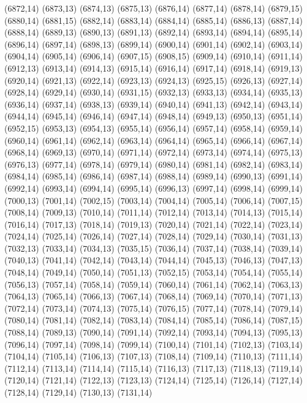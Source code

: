 (6872,14)
(6873,13)
(6874,13)
(6875,13)
(6876,14)
(6877,14)
(6878,14)
(6879,15)
(6880,14)
(6881,15)
(6882,14)
(6883,14)
(6884,14)
(6885,14)
(6886,13)
(6887,14)
(6888,14)
(6889,13)
(6890,13)
(6891,13)
(6892,14)
(6893,14)
(6894,14)
(6895,14)
(6896,14)
(6897,14)
(6898,13)
(6899,14)
(6900,14)
(6901,14)
(6902,14)
(6903,14)
(6904,14)
(6905,14)
(6906,14)
(6907,15)
(6908,15)
(6909,14)
(6910,14)
(6911,14)
(6912,13)
(6913,14)
(6914,13)
(6915,14)
(6916,14)
(6917,14)
(6918,14)
(6919,13)
(6920,14)
(6921,13)
(6922,14)
(6923,13)
(6924,13)
(6925,15)
(6926,13)
(6927,14)
(6928,14)
(6929,14)
(6930,14)
(6931,15)
(6932,13)
(6933,13)
(6934,14)
(6935,13)
(6936,14)
(6937,14)
(6938,13)
(6939,14)
(6940,14)
(6941,13)
(6942,14)
(6943,14)
(6944,14)
(6945,14)
(6946,14)
(6947,14)
(6948,14)
(6949,13)
(6950,13)
(6951,14)
(6952,15)
(6953,13)
(6954,13)
(6955,14)
(6956,14)
(6957,14)
(6958,14)
(6959,14)
(6960,14)
(6961,14)
(6962,14)
(6963,14)
(6964,14)
(6965,14)
(6966,14)
(6967,14)
(6968,14)
(6969,13)
(6970,14)
(6971,14)
(6972,14)
(6973,14)
(6974,14)
(6975,13)
(6976,13)
(6977,14)
(6978,14)
(6979,14)
(6980,14)
(6981,14)
(6982,14)
(6983,14)
(6984,14)
(6985,14)
(6986,14)
(6987,14)
(6988,14)
(6989,14)
(6990,13)
(6991,14)
(6992,14)
(6993,14)
(6994,14)
(6995,14)
(6996,13)
(6997,14)
(6998,14)
(6999,14)
(7000,13)
(7001,14)
(7002,15)
(7003,14)
(7004,14)
(7005,14)
(7006,14)
(7007,15)
(7008,14)
(7009,13)
(7010,14)
(7011,14)
(7012,14)
(7013,14)
(7014,13)
(7015,14)
(7016,14)
(7017,13)
(7018,14)
(7019,13)
(7020,14)
(7021,14)
(7022,14)
(7023,14)
(7024,14)
(7025,14)
(7026,14)
(7027,14)
(7028,14)
(7029,14)
(7030,14)
(7031,13)
(7032,13)
(7033,14)
(7034,13)
(7035,15)
(7036,14)
(7037,14)
(7038,14)
(7039,14)
(7040,13)
(7041,14)
(7042,14)
(7043,14)
(7044,14)
(7045,13)
(7046,13)
(7047,13)
(7048,14)
(7049,14)
(7050,14)
(7051,13)
(7052,15)
(7053,14)
(7054,14)
(7055,14)
(7056,13)
(7057,14)
(7058,14)
(7059,14)
(7060,14)
(7061,14)
(7062,14)
(7063,13)
(7064,13)
(7065,14)
(7066,13)
(7067,14)
(7068,14)
(7069,14)
(7070,14)
(7071,13)
(7072,14)
(7073,14)
(7074,13)
(7075,14)
(7076,15)
(7077,14)
(7078,14)
(7079,14)
(7080,14)
(7081,14)
(7082,14)
(7083,14)
(7084,14)
(7085,14)
(7086,14)
(7087,15)
(7088,14)
(7089,13)
(7090,14)
(7091,14)
(7092,14)
(7093,14)
(7094,13)
(7095,13)
(7096,14)
(7097,14)
(7098,14)
(7099,14)
(7100,14)
(7101,14)
(7102,13)
(7103,14)
(7104,14)
(7105,14)
(7106,13)
(7107,13)
(7108,14)
(7109,14)
(7110,13)
(7111,14)
(7112,14)
(7113,14)
(7114,14)
(7115,14)
(7116,13)
(7117,13)
(7118,13)
(7119,14)
(7120,14)
(7121,14)
(7122,13)
(7123,13)
(7124,14)
(7125,14)
(7126,14)
(7127,14)
(7128,14)
(7129,14)
(7130,13)
(7131,14)
